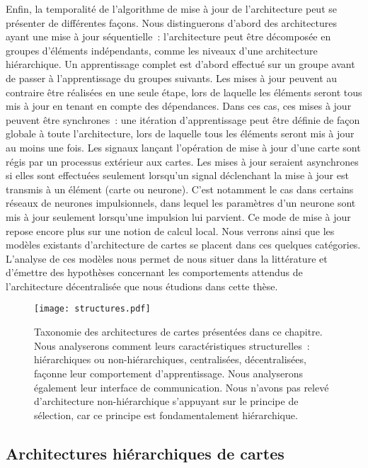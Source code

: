 \documentclass[../main]{subfiles}
\begin{document}
Enfin, la temporalité de l'algorithme de mise à jour de l'architecture peut se présenter de différentes façons. Nous distinguerons d'abord des architectures ayant une mise à jour séquentielle~: l'architecture peut être décomposée en groupes d'éléments indépendants, comme les niveaux d'une architecture hiérarchique. 
Un apprentissage complet est d'abord effectué sur un groupe avant de passer à l'apprentissage du groupes suivants. 
Les mises à jour peuvent au contraire être réalisées en une seule étape, lors de laquelle les éléments seront tous mis à jour en tenant en compte des dépendances. Dans ces cas, ces mises à jour peuvent être synchrones~: une itération d'apprentissage peut être définie de façon globale à toute l'architecture, lors de laquelle tous les éléments seront mis à jour au moins une fois. Les signaux lançant l'opération de mise à jour d'une carte sont régis par un processus extérieur aux cartes.
Les mises à jour seraient asynchrones si elles sont effectuées seulement lorsqu'un signal déclenchant la mise à jour est transmis à un élément (carte ou neurone). C'est notamment le cas dans certains réseaux de neurones impulsionnels, dans lequel les paramètres d'un neurone sont mis à jour seulement lorsqu'une impulsion lui parvient. Ce mode de mise à jour repose encore plus sur une notion de calcul local.
Nous verrons ainsi que les modèles existants d'architecture de cartes se placent dans ces quelques catégories. 
L'analyse de ces modèles nous permet de nous situer dans la littérature et d'émettre des hypothèses concernant les comportements attendus de l'architecture décentralisée que nous étudions dans cette thèse. 

\begin{figure}
\centering\texttt{[image: structures.pdf]}
\caption{Taxonomie des architectures de cartes présentées dans ce chapitre. Nous analyserons comment leurs caractéristiques structurelles~: hiérarchiques ou non-hiérarchiques, centralisées, décentralisées, façonne leur comportement d'apprentissage. Nous analyserons également leur interface de communication. Nous n'avons pas relevé d'architecture non-hiérarchique s'appuyant sur le principe de sélection, car ce principe est fondamentalement hiérarchique. \label{fig:taxo}}
\end{figure}



\subsection{Architectures hiérarchiques de cartes}
\end{document}
